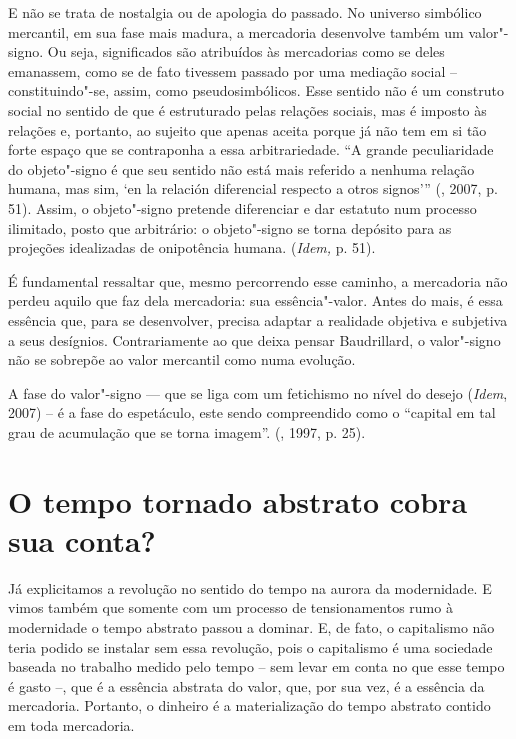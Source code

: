 E não se trata de nostalgia ou de apologia do passado. No universo
simbólico mercantil, em sua fase mais madura, a mercadoria desenvolve
também um valor"-signo. Ou seja, significados são atribuídos às
mercadorias como se deles emanassem, como se de fato tivessem passado
por uma mediação social -- constituindo"-se, assim, como
pseudosimbólicos. Esse sentido não é um construto social no sentido de
que é estruturado pelas relações sociais, mas é imposto às relações e,
portanto, ao sujeito que apenas aceita porque já não tem em si tão forte
espaço que se contraponha a essa arbitrariedade. ``A grande
peculiaridade do objeto"-signo é que seu sentido não está mais referido a
nenhuma relação humana, mas sim, `en la relación diferencial respecto a
otros signos''' (, 2007, p. 51). Assim, o objeto"-signo pretende
diferenciar e dar estatuto num processo ilimitado, posto que arbitrário:
o objeto"-signo se torna depósito para as projeções idealizadas de
onipotência humana. (\emph{Idem,} p. 51).

É fundamental ressaltar que, mesmo percorrendo esse caminho, a
mercadoria não perdeu aquilo que faz dela mercadoria: sua
essência"-valor. Antes do mais, é essa essência que, para se desenvolver,
precisa adaptar a realidade objetiva e subjetiva a seus desígnios.
Contrariamente ao que deixa pensar Baudrillard, o valor"-signo não se
sobrepõe ao valor mercantil como numa evolução.

A fase do valor"-signo --- que se liga com um fetichismo no nível do
desejo (\emph{Idem}, 2007) -- é a fase do espetáculo, este sendo
compreendido como o ``capital em tal grau de acumulação que se torna
imagem''. (, 1997, p. 25).

\section{O tempo tornado abstrato cobra sua conta?}

Já explicitamos a revolução no sentido do tempo na aurora da
modernidade. E vimos também que somente com um processo de
tensionamentos rumo à modernidade o tempo abstrato passou a dominar. E,
de fato, o capitalismo não teria podido se instalar sem essa revolução,
pois o capitalismo é uma sociedade baseada no trabalho medido pelo tempo
-- sem levar em conta no que esse tempo é gasto --, que é a essência
abstrata do valor, que, por sua vez, é a essência da mercadoria.
Portanto, o dinheiro é a materialização do tempo abstrato contido em
toda mercadoria.

